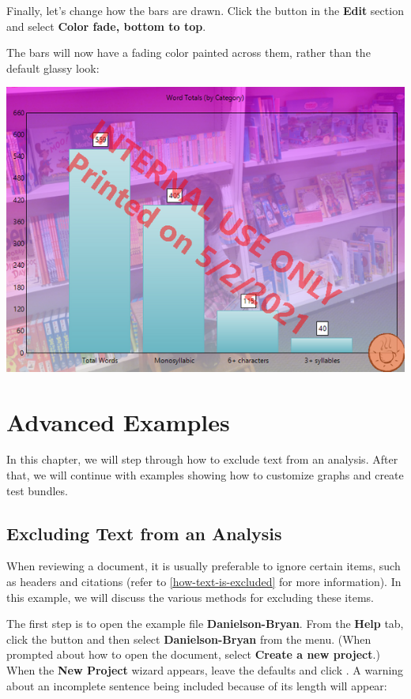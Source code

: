 \documentclass[
]{book}
\theoremstyle{definition}
\theoremstyle{definition}
\theoremstyle{definition}
\theoremstyle{definition}
\theoremstyle{remark}
\begin{document}
Finally, let's change how the bars are drawn. Click the  button in the \textbf{Edit} section and select \textbf{Color fade, bottom to top}.

The bars will now have a fading color painted across them, rather than the default glassy look:

\includegraphics{Images/ExampleBarChartEffectsChanged.png}

\hypertarget{advanced-examples}{%
\chapter{Advanced Examples}\label{advanced-examples}}

In this chapter, we will step through how to exclude text from an analysis. After that, we will continue with examples showing how to customize graphs and create test bundles.

\hypertarget{excluding-text-from-analysis}{%
\section{Excluding Text from an Analysis}\label{excluding-text-from-analysis}}

When reviewing a document, it is usually preferable to ignore certain items, such as headers and citations (refer to \ref{how-text-is-excluded} for more information). In this example, we will discuss the various methods for excluding these items.

The first step is to open the example file \textbf{Danielson-Bryan}. From the \textbf{Help} tab, click the  button and then select \textbf{Danielson-Bryan} from the menu. (When prompted about how to open the document, select \textbf{Create a new project}.) When the \textbf{New Project} wizard appears, leave the defaults and click . A warning about an incomplete sentence being included because of its length will appear:
\end{document}
